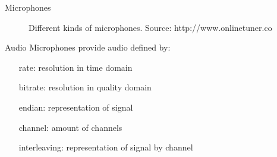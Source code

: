 \documentclass{beamer}
\begin{document}
	\begin{frame}{Microphones}
		\begin{figure}[ht]
			\centering
			\caption{Different kinds of microphones. Source: http://www.onlinetuner.co}
		\end{figure}
	\end{frame}
	
	\begin{frame}{Audio}
		Microphones provide audio defined by:
		\begin{itemize}[leftmargin=*,labelindent=50pt]
			\item[rate:] resolution in time domain
			\item[bitrate:] resolution in quality domain
			\item[endian:] representation of signal
			\item[channel:] amount of channels 
			\item[interleaving:] representation of signal by channel
		\end{itemize}
	\end{frame}
	
\end{document}
